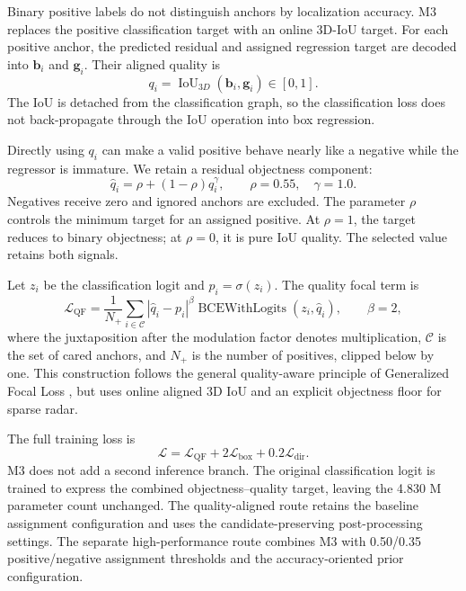 \documentclass[preprint,12pt,times]{elsarticle}
\begin{document}
Binary positive labels do not distinguish anchors by localization accuracy.
M3 replaces the positive classification target with an online 3D-IoU target.
For each positive anchor, the predicted residual and assigned regression
target are decoded into $\mathbf{b}_i$ and $\mathbf{g}_i$. Their aligned
quality is
\begin{equation}
q_i=\operatorname{IoU}_{3D}(\mathbf{b}_i,\mathbf{g}_i)\in[0,1].
\end{equation}
The IoU is detached from the classification graph, so the classification loss
does not back-propagate through the IoU operation into box regression.

Directly using $q_i$ can make a valid positive behave nearly like a negative
while the regressor is immature. We retain a residual objectness component:
\begin{equation}
\widehat q_i=\rho+(1-\rho)q_i^\gamma,
\qquad \rho=0.55,\quad \gamma=1.0.
\label{eq:quality-target}
\end{equation}
Negatives receive zero and ignored anchors are excluded. The parameter $\rho$
controls the minimum target for an assigned positive. At $\rho=1$, the target
reduces to binary objectness; at $\rho=0$, it is pure IoU quality. The selected
value retains both signals.

Let $z_i$ be the classification logit and $p_i=\sigma(z_i)$. The quality focal
term is
\begin{equation}
\mathcal{L}_{\mathrm{QF}} =
\frac{1}{N_+}\sum_{i\in\mathcal{C}}
\left|\widehat q_i-p_i\right|^\beta
\operatorname{BCEWithLogits}(z_i,\widehat q_i),
\qquad \beta=2,
\end{equation}
where the juxtaposition after the modulation factor denotes multiplication,
$\mathcal{C}$ is the set of cared anchors, and $N_+$ is the number of
positives, clipped below by one. This construction follows the general
quality-aware principle of Generalized Focal Loss
\cite{li2022gfl}, but uses online aligned 3D IoU and an explicit objectness
floor for sparse radar.

The full training loss is
\begin{equation}
\mathcal{L}=\mathcal{L}_{\mathrm{QF}}
+2\mathcal{L}_{\mathrm{box}}+0.2\mathcal{L}_{\mathrm{dir}}.
\end{equation}
M3 does not add a second inference branch. The original classification logit
is trained to express the combined objectness--quality target, leaving the
4.830 M parameter count unchanged. The quality-aligned route retains the
baseline assignment configuration and uses the candidate-preserving
post-processing settings. The separate high-performance route combines M3
with 0.50/0.35 positive/negative assignment thresholds and the
accuracy-oriented prior configuration.
\end{document}
